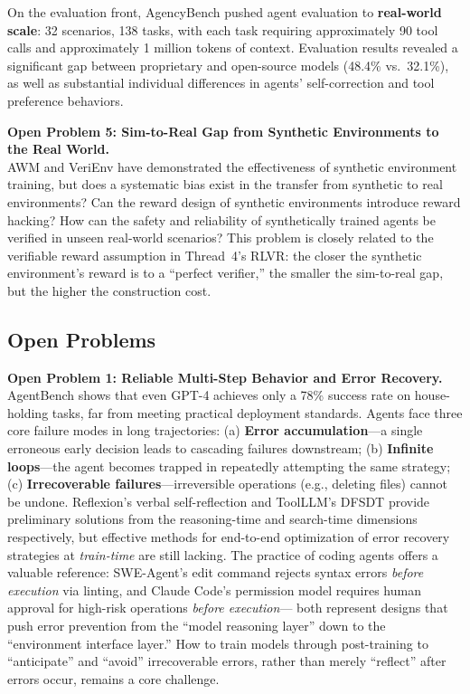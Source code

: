 On the evaluation front,
AgencyBench \cite{li2026agencybench} pushed agent evaluation to
\textbf{real-world scale}:
32 scenarios, 138 tasks,
with each task requiring approximately 90 tool calls and approximately 1 million tokens of context.
Evaluation results revealed a significant gap between proprietary and open-source models
(48.4\% vs.\ 32.1\%),
as well as substantial individual differences in agents' self-correction and tool preference behaviors.

\begin{openproblembox}
\textbf{Open Problem 5: Sim-to-Real Gap from Synthetic Environments to the Real World.}\\
AWM and VeriEnv have demonstrated the effectiveness of synthetic environment training,
but does a systematic bias exist in the transfer from synthetic to real environments?
Can the reward design of synthetic environments introduce reward hacking?
How can the safety and reliability of synthetically trained agents be verified in unseen real-world scenarios?
This problem is closely related to the verifiable reward assumption in Thread~4's RLVR:
the closer the synthetic environment's reward is to a ``perfect verifier,''
the smaller the sim-to-real gap, but the higher the construction cost.
\end{openproblembox}

\subsection{Open Problems}
\label{sec:t6-open}

\begin{openproblembox}
\textbf{Open Problem 1: Reliable Multi-Step Behavior and Error Recovery.}\\
AgentBench shows that even GPT-4 achieves only a 78\% success rate on house-holding tasks,
far from meeting practical deployment standards.
Agents face three core failure modes in long trajectories:
(a) \textbf{Error accumulation}---a single erroneous early decision leads to cascading failures downstream;
(b) \textbf{Infinite loops}---the agent becomes trapped in repeatedly attempting the same strategy;
(c) \textbf{Irrecoverable failures}---irreversible operations (e.g., deleting files) cannot be undone.
Reflexion's verbal self-reflection and ToolLLM's DFSDT
provide preliminary solutions from the reasoning-time and search-time dimensions respectively,
but effective methods for end-to-end optimization of error recovery strategies at \emph{train-time} are still lacking.
The practice of coding agents offers a valuable reference:
SWE-Agent's edit command rejects syntax errors \emph{before execution} via linting,
and Claude Code's permission model requires human approval for high-risk operations \emph{before execution}---
both represent designs that push error prevention from the ``model reasoning layer'' down to the ``environment interface layer.''
How to train models through post-training to ``anticipate'' and ``avoid'' irrecoverable errors,
rather than merely ``reflect'' after errors occur, remains a core challenge.
\end{openproblembox}

